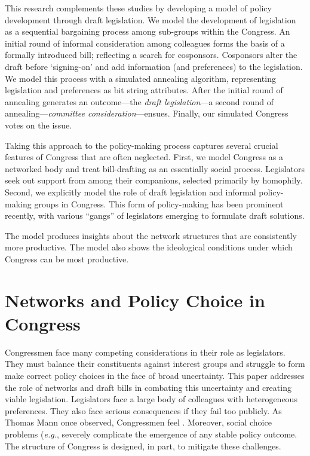 \documentclass[pdftex,12pt]{llncs}
\begin{document}
This research complements these studies by developing a model of policy development through draft legislation. 
We model the development of legislation as a sequential bargaining process among sub-groups within the Congress. 
An initial round of informal consideration among colleagues forms the basis of a formally introduced bill; reflecting a search for cosponsors. 
Cosponsors alter the draft before `signing-on' and add information (and preferences) to the legislation. 
We model this process with a simulated annealing algorithm, representing legislation and preferences as bit string attributes. 
After the initial round of annealing generates an outcome---the \textit{draft legislation}---a second round of annealing---\textit{committee consideration}---ensues. 
Finally, our simulated Congress votes on the issue.

Taking this approach to the policy-making process captures several crucial features of Congress that are often neglected. 
First, we model Congress as a networked body and treat bill-drafting as an essentially social process. 
Legislators seek out support from among their companions, selected primarily by homophily. 
Second, we explicitly model the role of draft legislation and informal policy-making groups in Congress. 
This form of policy-making has been prominent recently, with various ``gangs'' of legislators emerging to formulate draft solutions.

The model produces insights about the network structures that are consistently more productive. The model also shows the ideological conditions under which Congress can be most productive. 
        

\section{Networks and Policy Choice in Congress}

Congressmen face many competing considerations in their role as legislators. 
They must balance their constituents against interest groups and struggle to form make correct policy choices in the face of broad uncertainty. 
This paper addresses the role of networks and draft bills in combating this uncertainty and creating viable legislation.
Legislators face a large body of colleagues with heterogeneous preferences. 
They also face serious consequences if they fail too publicly. 
As Thomas Mann once observed, Congressmen feel  \parencite{m78}. 
Moreover, social choice problems (\textit{e.g.}, \cite{sw87} severely complicate the emergence of any stable policy outcome. 
The structure of Congress is designed, in part, to mitigate these challenges\parencite{sw87}. 
\end{document}
